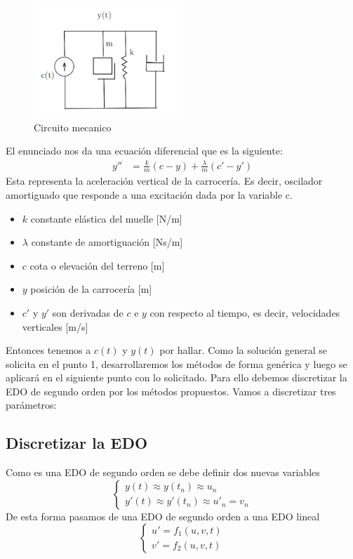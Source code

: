 \begin{figure}[h] 
    \centering
    \includegraphics[width=0.5\textwidth]{imagenes/circuito.png}
    \caption{Circuito mecanico}
    \label{fig:figura2}
\end{figure}
El enunciado nos da una ecuación diferencial que es la siguiente:
\begin{align}
    y'' &= \frac{k}{m}(c - y) + \frac{\lambda}{m}(c' - y')
\end{align}
Esta representa la aceleración vertical de la carrocería. Es decir, oscilador amortiguado que responde a una excitación dada por la variable c.
\begin{itemize}
    \item \( k \) constante elástica del muelle [N/m]
    \item \( \lambda \) constante de amortiguación [Ns/m]
    \item \( c \) cota o elevación del terreno [m]
    \item \( y \) posición de la carrocería [m]
    \item \( c' \) y \( y' \) son derivadas de \( c \) e \( y \) con respecto al tiempo, es decir, velocidades verticales [m/s]
\end{itemize}
Entonces tenemos a \(c(t)\) y \(y(t)\) por hallar.
Como la solución general se solicita en el punto 1, desarrollaremos los métodos de forma genérica y luego se aplicará en el siguiente punto con lo solicitado.
Para ello debemos discretizar la EDO de segundo orden por los métodos propuestos.
Vamos a discretizar tres parámetros:
\subsection{Discretizar la EDO}
Como es una EDO de segundo orden se debe definir dos nuevas variables
\[
\begin{cases}
    y(t) \approx y(t_n) \approx u_n \\
    y'(t) \approx y'(t_n) \approx u'_n = v_n 
\end{cases}
\]
De esta forma pasamos de una EDO de segundo orden a una EDO lineal
\[
\begin{cases}
    u' = f_1(u,v,t) \\
    v' = f_2(u,v,t)
\end{cases}
\]